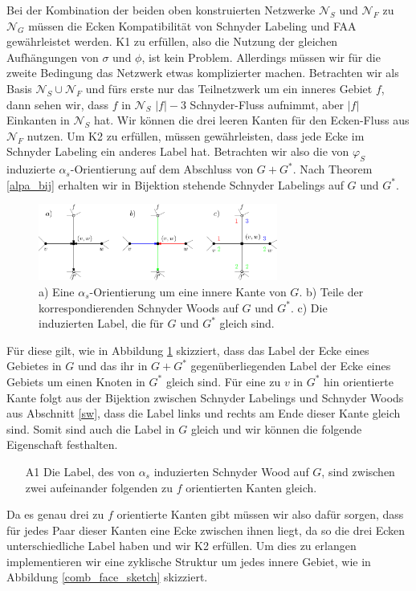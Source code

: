 Bei der Kombination der beiden oben konstruierten Netzwerke $\mathcal{N}_S$ und $\mathcal{N}_F$ zu $\mathcal{N}_G$ müssen die Ecken Kompatibilität von Schnyder Labeling und FAA gewährleistet werden. K1 zu erfüllen, also die Nutzung der gleichen Aufhängungen von $\sigma$ und $\phi$, ist kein Problem. Allerdings müssen wir für die zweite Bedingung das Netzwerk etwas komplizierter machen. Betrachten wir als Basis $\mathcal{N}_S \cup \mathcal{N}_F$ und fürs erste nur das Teilnetzwerk um ein inneres Gebiet $f$, dann sehen wir, dass $f$ in $\mathcal{N}_S$ $|f|-3$ Schnyder-Fluss aufnimmt, aber $|f|$ Einkanten in $\mathcal{N}_S$ hat. Wir können die drei leeren Kanten für den Ecken-Fluss aus $\mathcal{N}_F$ nutzen. Um K2 zu erfüllen, müssen gewährleisten, dass jede Ecke im Schnyder Labeling ein anderes Label hat. Betrachten wir also die von $\varphi_S$ induzierte $\alpha_s$-Orientierung auf dem Abschluss von $G+G^*$. Nach Theorem \ref{alpa_bij} erhalten wir in Bijektion stehende Schnyder Labelings auf $G$ und $G^*$.

\begin{figure}[h]
	\centering
  	\includegraphics[width=0.7\textwidth]{alpha_bij.png}
  	\caption{a) Eine $\alpha_s$-Orientierung um eine innere Kante von $G$. b) Teile der korrespondierenden Schnyder Woods auf $G$ und $G^*$. c) Die induzierten Label, die für $G$ und $G^*$ gleich sind.}
	\label{alpha_bij}
\end{figure}

Für diese gilt, wie in Abbildung \ref{alpha_bij} skizziert, dass das Label der Ecke eines Gebietes in $G$ und das ihr in $G+G^*$ gegenüberliegenden Label der Ecke eines Gebiets um einen Knoten in $G^*$ gleich sind. Für eine zu $v$ in $G^*$ hin orientierte Kante folgt aus der Bijektion zwischen Schnyder Labelings und Schnyder Woods aus Abschnitt \ref{sw}, dass die Label links und rechts am Ende dieser Kante gleich sind. Somit sind auch die Label in $G$ gleich und wir können die folgende Eigenschaft festhalten.
\begin{itemize}
\item [A1] Die Label, des von $\alpha_s$ induzierten Schnyder Wood auf $G$, sind zwischen zwei aufeinander folgenden zu $f$ orientierten Kanten gleich.
\end{itemize}
Da es genau drei zu $f$ orientierte Kanten gibt müssen wir also dafür sorgen, dass für jedes Paar dieser Kanten eine Ecke zwischen ihnen liegt, da so die drei Ecken unterschiedliche Label haben und wir K2 erfüllen. Um dies zu erlangen implementieren wir eine zyklische Struktur um jedes innere Gebiet, wie in Abbildung \ref{comb_face_sketch} skizziert.\\

